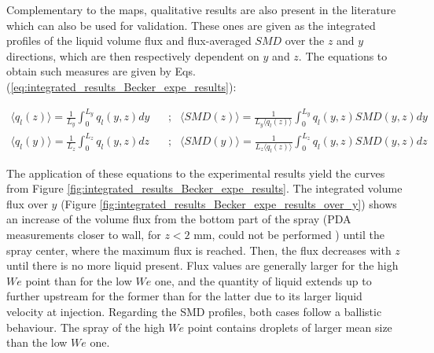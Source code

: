 Complementary to the maps, qualitative results are also present in the literature which can also be used for validation. These ones are given as the integrated profiles of the liquid volume flux and flux-averaged $SMD$ over the $z$ and $y$ directions, which are then respectively dependent on $y$ and $z$. The equations to obtain such measures are given by Eqs. (\ref{eq:integrated_results_Becker_expe_results}):


\begin{subequations}
\label{eq:integrated_results_Becker_expe_results}
\begin{align}
\langle q_l \left( z \right) \rangle = \frac{1}{L_y} \int_0^{L_y} q_l \left( y, z \right) dy    & ~~~~  ; & \langle SMD \left( z \right) \rangle = \frac{1}{L_y \langle q_l \left( z \right) \rangle} \int_0^{L_y} q_l \left( y, z \right) SMD \left( y, z \right) dy \\
\langle q_l \left( y \right) \rangle = \frac{1}{L_z} \int_0^{L_z} q_l \left( y, z \right) dz    & ~~~~  ; & \langle SMD \left( y \right) \rangle =  \frac{1}{L_z \langle q_l \left( z \right) \rangle} \int_0^{L_z} q_l \left( y, z \right) SMD \left( y, z \right) dz
\end{align}
\end{subequations}


%

The application of these equations to the experimental results yield the curves from Figure \ref{fig:integrated_results_Becker_expe_results}. The integrated volume flux over $y$ (Figure \ref{fig:integrated_results_Becker_expe_results_over_y}) shows an increase of the volume flux from the bottom part of the spray (PDA measurements closer to wall, for $z < 2$ mm, could not be performed ) until the spray center, where the maximum flux is reached. Then, the flux decreases with $z$ until there is no more liquid present. Flux values are generally larger for the high $We$ point than for the low $We$ one, and the quantity of liquid extends up to further upstream for the former than for the latter due to its larger liquid velocity at injection. Regarding the SMD profiles, both cases follow a ballistic behaviour. The spray of the high $We$ point contains droplets of larger mean size than the low $We$ one.


